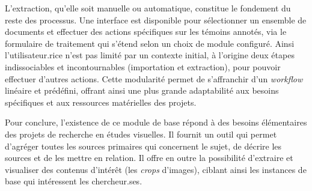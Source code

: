 L'extraction, qu'elle soit manuelle ou automatique, constitue le
fondement du reste des processus. Une interface est disponible pour
sélectionner un ensemble de documents et effectuer des actions
spécifiques sur les témoins annotés, via le formulaire de traitement qui
s'étend selon un choix de module configuré. Ainsi l'utilisateur.rice n'est
pas limité par un contexte initial, à l'origine deux étapes
indissociables et incontournables (importation et extraction), pour
pouvoir effectuer d'autres actions. Cette modularité permet de
s'affranchir d'un \textit{workflow} linéaire et prédéfini, offrant ainsi une plus
grande adaptabilité aux besoins spécifiques et aux ressources
matérielles des projets.

Pour conclure, l'existence de ce module de base répond à des besoins
élémentaires des projets de recherche en études visuelles. Il fournit un
outil qui permet d'agréger toutes les sources primaires qui concernent
le sujet, de décrire les sources et de les mettre en relation. Il offre
en outre la possibilité d'extraire et visualiser des contenus d'intérêt
(les \textit{crops} d'images), ciblant ainsi les instances de base qui
intéressent les chercheur.ses.